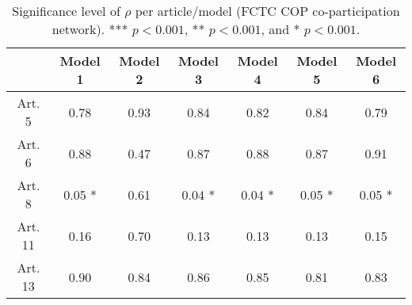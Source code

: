 \begin{table}[ht]
\centering
\begin{tabular}{ccccccc}
  \toprule
 & Model 1 & Model 2 & Model 3 & Model 4 & Model 5 & Model 6 \\ 
  \midrule
Art. 5 & 0.78   & 0.93   & 0.84   & 0.82   & 0.84   & 0.79   \\ 
   \midrule
Art. 6 & 0.88   & 0.47   & 0.87   & 0.88   & 0.87   & 0.91   \\ 
   \midrule
Art. 8 & 0.05 * & 0.61   & 0.04 * & 0.04 * & 0.05 * & 0.05 * \\ 
   \midrule
Art. 11 & 0.16   & 0.70   & 0.13   & 0.13   & 0.13   & 0.15   \\ 
   \midrule
Art. 13 & 0.90   & 0.84   & 0.86   & 0.85   & 0.81   & 0.83   \\ 
   \bottomrule
\end{tabular}
\caption{Significance level of $\rho$ per article/model (FCTC COP co-participation network). *** $p < 0.001$, ** $p < 0.001$, and * $p < 0.001$.} 
\end{table}
